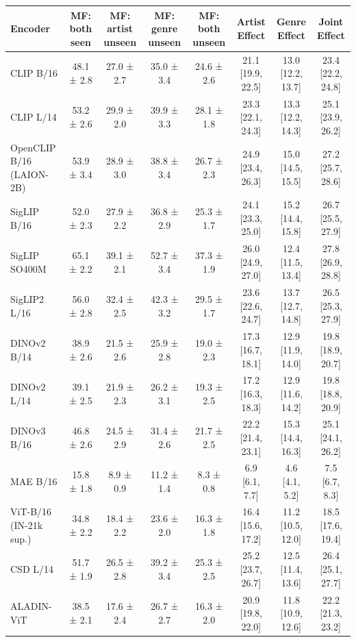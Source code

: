 \begin{tabular}{lccccccc}
\toprule
Encoder & MF: both seen & MF: artist unseen & MF: genre unseen & MF: both unseen & Artist Effect & Genre Effect & Joint Effect \\
\midrule
CLIP B/16 & 48.1 ± 2.8 & 27.0 ± 2.7 & 35.0 ± 3.4 & 24.6 ± 2.6 & 21.1 [19.9, 22.5] & 13.0 [12.2, 13.7] & 23.4 [22.2, 24.8] \\
CLIP L/14 & 53.2 ± 2.6 & 29.9 ± 2.0 & 39.9 ± 3.3 & 28.1 ± 1.8 & 23.3 [22.1, 24.3] & 13.3 [12.2, 14.3] & 25.1 [23.9, 26.2] \\
OpenCLIP B/16 (LAION-2B) & 53.9 ± 3.4 & 28.9 ± 3.0 & 38.8 ± 3.4 & 26.7 ± 2.3 & 24.9 [23.4, 26.3] & 15.0 [14.5, 15.5] & 27.2 [25.7, 28.6] \\
SigLIP B/16 & 52.0 ± 2.3 & 27.9 ± 2.2 & 36.8 ± 2.9 & 25.3 ± 1.7 & 24.1 [23.3, 25.0] & 15.2 [14.4, 15.8] & 26.7 [25.5, 27.9] \\
SigLIP SO400M & 65.1 ± 2.2 & 39.1 ± 2.1 & 52.7 ± 3.4 & 37.3 ± 1.9 & 26.0 [24.9, 27.0] & 12.4 [11.5, 13.4] & 27.8 [26.9, 28.8] \\
SigLIP2 L/16 & 56.0 ± 2.8 & 32.4 ± 2.5 & 42.3 ± 3.2 & 29.5 ± 1.7 & 23.6 [22.6, 24.7] & 13.7 [12.7, 14.8] & 26.5 [25.3, 27.9] \\
DINOv2 B/14 & 38.9 ± 2.6 & 21.5 ± 2.6 & 25.9 ± 2.8 & 19.0 ± 2.3 & 17.3 [16.7, 18.1] & 12.9 [11.9, 14.0] & 19.8 [18.9, 20.7] \\
DINOv2 L/14 & 39.1 ± 2.5 & 21.9 ± 2.3 & 26.2 ± 3.1 & 19.3 ± 2.5 & 17.2 [16.3, 18.3] & 12.9 [11.6, 14.2] & 19.8 [18.8, 20.9] \\
DINOv3 B/16 & 46.8 ± 2.6 & 24.5 ± 2.9 & 31.4 ± 2.6 & 21.7 ± 2.5 & 22.2 [21.4, 23.1] & 15.3 [14.4, 16.3] & 25.1 [24.1, 26.2] \\
MAE B/16 & 15.8 ± 1.8 & 8.9 ± 0.9 & 11.2 ± 1.4 & 8.3 ± 0.8 & 6.9 [6.1, 7.7] & 4.6 [4.1, 5.2] & 7.5 [6.7, 8.3] \\
ViT-B/16 (IN-21k sup.) & 34.8 ± 2.2 & 18.4 ± 2.2 & 23.6 ± 2.0 & 16.3 ± 1.8 & 16.4 [15.6, 17.2] & 11.2 [10.5, 12.0] & 18.5 [17.6, 19.4] \\
CSD L/14 & 51.7 ± 1.9 & 26.5 ± 2.8 & 39.2 ± 3.4 & 25.3 ± 2.5 & 25.2 [23.7, 26.7] & 12.5 [11.4, 13.6] & 26.4 [25.1, 27.7] \\
ALADIN-ViT & 38.5 ± 2.1 & 17.6 ± 2.4 & 26.7 ± 2.7 & 16.3 ± 2.0 & 20.9 [19.8, 22.0] & 11.8 [10.9, 12.6] & 22.2 [21.3, 23.2] \\
\bottomrule
\end{tabular}
